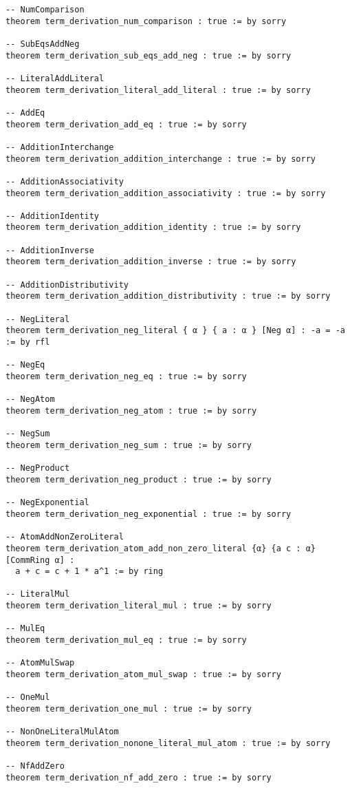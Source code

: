 \documentclass{article}
\begin{document}
\begin{tcolorbox}[colback=white!10, width=\linewidth]
\begin{lstlisting}[language=Lean4]
-- NumComparison
theorem term_derivation_num_comparison : true := by sorry

-- SubEqsAddNeg
theorem term_derivation_sub_eqs_add_neg : true := by sorry

-- LiteralAddLiteral
theorem term_derivation_literal_add_literal : true := by sorry

-- AddEq
theorem term_derivation_add_eq : true := by sorry

-- AdditionInterchange
theorem term_derivation_addition_interchange : true := by sorry

-- AdditionAssociativity
theorem term_derivation_addition_associativity : true := by sorry

-- AdditionIdentity
theorem term_derivation_addition_identity : true := by sorry

-- AdditionInverse
theorem term_derivation_addition_inverse : true := by sorry

-- AdditionDistributivity
theorem term_derivation_addition_distributivity : true := by sorry

-- NegLiteral
theorem term_derivation_neg_literal { α } { a : α } [Neg α] : -a = -a := by rfl

-- NegEq
theorem term_derivation_neg_eq : true := by sorry

-- NegAtom
theorem term_derivation_neg_atom : true := by sorry

-- NegSum
theorem term_derivation_neg_sum : true := by sorry

-- NegProduct
theorem term_derivation_neg_product : true := by sorry

-- NegExponential
theorem term_derivation_neg_exponential : true := by sorry

-- AtomAddNonZeroLiteral
theorem term_derivation_atom_add_non_zero_literal {α} {a c : α} [CommRing α] : 
  a + c = c + 1 * a^1 := by ring

-- LiteralMul
theorem term_derivation_literal_mul : true := by sorry

-- MulEq
theorem term_derivation_mul_eq : true := by sorry

-- AtomMulSwap
theorem term_derivation_atom_mul_swap : true := by sorry

-- OneMul
theorem term_derivation_one_mul : true := by sorry

-- NonOneLiteralMulAtom
theorem term_derivation_nonone_literal_mul_atom : true := by sorry

-- NfAddZero
theorem term_derivation_nf_add_zero : true := by sorry


\end{lstlisting}
\end{tcolorbox}
\end{document}
